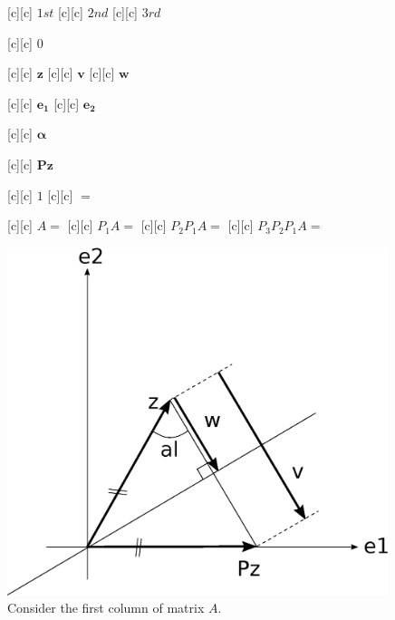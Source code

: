 \begin{figure}[htb!]
	\centering
	\footnotesize

	[c] {$1st$}
	[c] {$2nd$}
	[c] {$3rd$}

	[c] {$0$}

	[c] {$\bm{z}$}
	[c] {$\bm{v}$}
	[c] {$\bm{w}$}

	[c] {$\bm{e_{1}}$}
	[c] {$\bm{e_{2}}$}

	[c] {$\bm{\alpha}$}

	[c] {$\bm{Pz}$}

	[c] {$1$}
	[c] {$=$}

	[c] {$A=$}
	[c] {$P_{1}A=$}
	[c] {$P_{2}P_{1}A=$}
	[c] {$P_{3}P_{2}P_{1}A=$}

	\includegraphics[width=0.99\textwidth]{householder_projection.eps}
	\caption{Consider the first column of matrix $A$.}
	\label{\LABEL}
\end{figure}